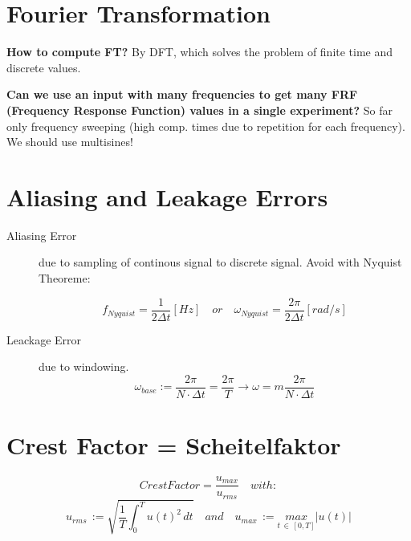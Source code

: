 \section*{Fourier Transformation}
\textbf{How to compute FT?} By DFT, which solves the problem of finite time and discrete values.

\textbf{Can we use an input with many frequencies to get many FRF (Frequency Response Function) values in a single experiment?} So far only frequency sweeping (high comp. times due to repetition for each frequency). We should use multisines!

\section*{Aliasing and Leakage Errors}
\begin{description}
\item[Aliasing Error] due to sampling of continous signal to discrete signal. Avoid with Nyquist Theoreme:

\begin{equation*}
f_{Nyquist} = \frac{1}{2\Delta t} [Hz] \quad or \quad \omega_{Nyquist} = \frac{2 \pi }{ 2\Delta t} [rad/s]
\end{equation*}

\item[Leackage Error] due to windowing.
\begin{equation*}
\omega _{ base }:=\frac { 2\pi  }{ N\cdot \Delta t } =\frac { 2\pi  }{ T }  \rightarrow \omega = m\frac { 2\pi  }{ N\cdot \Delta t }
\end{equation*}
\end{description}


\section*{Crest Factor = Scheitelfaktor}
\begin{equation*}
CrestFactor=\frac { u_{ max } }{ u_{ rms } } \quad with:
\end{equation*}
\begin{equation*}
u_{ rms }\, := \sqrt{ \frac { 1 }{ T } \int _{ 0 }^{ T }{ u(t)^2 \, dt }  } \quad and \quad u_{ max }\, :=\underset { t\, \in \, [0,T] }{ max } |u(t)|
\end{equation*}

